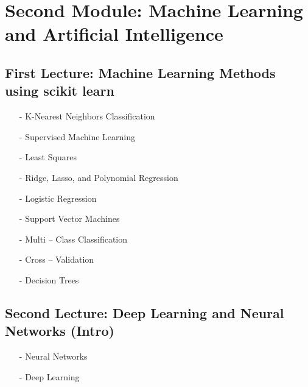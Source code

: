 \section*{Second Module: Machine Learning and Artificial Intelligence}

\subsection*{First Lecture: Machine Learning Methods using scikit learn}
\begin{itemize}
\item[-]	K-Nearest Neighbors Classification
\item[-]	Supervised Machine Learning
\item[-]	Least Squares
\item[-]	Ridge, Lasso, and Polynomial Regression
\item[-]	Logistic Regression
\item[-]	Support Vector Machines
\item[-]	Multi – Class Classification
\item[-]	Cross – Validation
\item[-]	Decision Trees
\end{itemize}

\subsection*{Second Lecture: Deep Learning and Neural Networks (Intro)}
\begin{itemize}
\item[-]	Neural Networks
\item[-]	Deep Learning
\end{itemize}

